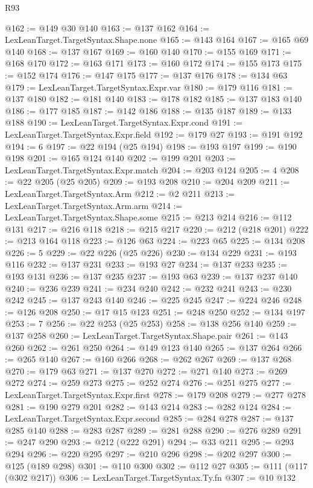 \begin{lexlean}{R93}
\begin{coremodule}
@162 := @149 @30 @140
@163 := @137 @162
@164 := LexLeanTarget.TargetSyntax.Shape.none
@165 := @143 @164
@167 := @165 @69 @140
@168 := @137 @167
@169 := @160 @140
@170 := @155 @169
@171 := @168 @170
@172 := @163 @171
@173 := @160 @172
@174 := @155 @173
@175 := @152 @174
@176 := @147 @175
@177 := @137 @176
@178 := @134 @63
@179 := LexLeanTarget.TargetSyntax.Expr.var
@180 := @179 @116
@181 := @137 @180
@182 := @181 @140
@183 := @178 @182
@185 := @137 @183 @140
@186 := @177 @185
@187 := @142 @186
@188 := @135 @187
@189 := @133 @188
@190 := LexLeanTarget.TargetSyntax.Expr.cond
@191 := LexLeanTarget.TargetSyntax.Expr.field
@192 := @179 @27
@193 := @191 @192
@194 := 6
@197 := @22 @194 (@25 @194)
@198 := @193 @197
@199 := @190 @198
@201 := @165 @124 @140
@202 := @199 @201
@203 := LexLeanTarget.TargetSyntax.Expr.match
@204 := @203 @124
@205 := 4
@208 := @22 @205 (@25 @205)
@209 := @193 @208
@210 := @204 @209
@211 := LexLeanTarget.TargetSyntax.Arm
@212 := @2 @211
@213 := LexLeanTarget.TargetSyntax.Arm.arm
@214 := LexLeanTarget.TargetSyntax.Shape.some
@215 := @213 @214
@216 := @112 @131
@217 := @216 @118
@218 := @215 @217
@220 := @212 (@218 @201)
@222 := @213 @164 @118
@223 := @126 @63
@224 := @223 @65
@225 := @134 @208
@226 := 5
@229 := @22 @226 (@25 @226)
@230 := @134 @229
@231 := @193 @116
@232 := @137 @231
@233 := @193 @27
@234 := @137 @233
@235 := @193 @131
@236 := @137 @235
@237 := @193 @63
@239 := @137 @237 @140
@240 := @236 @239
@241 := @234 @240
@242 := @232 @241
@243 := @230 @242
@245 := @137 @243 @140
@246 := @225 @245
@247 := @224 @246
@248 := @126 @208
@250 := @17 @15 @123
@251 := @248 @250
@252 := @134 @197
@253 := 7
@256 := @22 @253 (@25 @253)
@258 := @138 @256 @140
@259 := @137 @258
@260 := LexLeanTarget.TargetSyntax.Shape.pair
@261 := @143 @260
@262 := @261 @250
@264 := @149 @123 @140
@265 := @137 @264
@266 := @265 @140
@267 := @160 @266
@268 := @262 @267
@269 := @137 @268
@270 := @179 @63
@271 := @137 @270
@272 := @271 @140
@273 := @269 @272
@274 := @259 @273
@275 := @252 @274
@276 := @251 @275
@277 := LexLeanTarget.TargetSyntax.Expr.first
@278 := @179 @208
@279 := @277 @278
@281 := @190 @279 @201
@282 := @143 @214
@283 := @282 @124
@284 := LexLeanTarget.TargetSyntax.Expr.second
@285 := @284 @278
@287 := @137 @285 @140
@288 := @283 @287
@289 := @281 @288
@290 := @276 @289
@291 := @247 @290
@293 := @212 (@222 @291)
@294 := @33 @211
@295 := @293 @294
@296 := @220 @295
@297 := @210 @296
@298 := @202 @297
@300 := @125 (@189 @298)
@301 := @110 @300
@302 := @112 @27
@305 := @111 (@117 (@302 @217))
@306 := LexLeanTarget.TargetSyntax.Ty.fn
@307 := @10 @132

\end{coremodule}
\end{lexlean}
